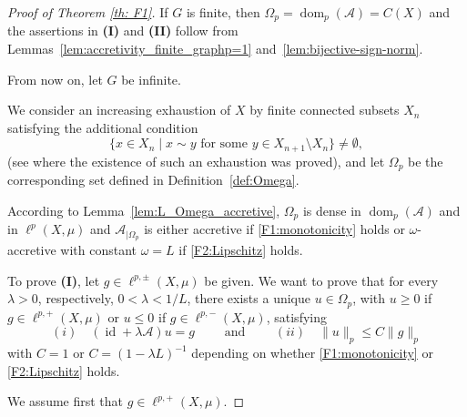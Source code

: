 \documentclass[journal]{article}
\theoremstyle{nonitalic}
\theoremstyle{nonitalic}
\theoremstyle{plain} %
\numberwithin{equation}{section}
\newcommand{\dom}{\operatorname{dom}}
\begin{document}
\begin{proof}[Proof of Theorem \ref{th: F1}]
 If $G$ is finite, then $\Omega_p= \dom_p(\mathcal{A})=C(X)$ and the assertions  in \textnormal{\textbf{(I)}} and \textnormal{\textbf{(II)}} follow from Lemmas~\ref{lem:accretivity_finite_graphp=1} and~\ref{lem:bijective-sign-norm}. 
 
 
 From now on, let $G$ be infinite.  

We consider an increasing exhaustion of $X$ by finite connected subsets $X_n$ satisfying the additional condition 
\begin{equation}\label{eq:property_sets2}
	\{ x \in X_n \mid x\sim y \mbox{ for some } y \in X_{n+1}\setminus X_n \} \ne \emptyset,
\end{equation}
(see \cite[Lemma A.4 ]{bianchi2022generalized} where the existence of such an exhaustion was proved), and let $\Omega_p$ be the corresponding set defined in Definition~\ref{def:Omega}.


According to Lemma~\ref{lem:L_Omega_accretive}, $\Omega_p$  is dense in $\dom_p(\mathcal A)$ and in $\ell^p(X,\mu)$ and  $\mathcal{A}_{|\Omega_p}$  is either accretive if \textnormal{\ref{F1:monotonicity}} holds or $\omega$-accretive with constant $\omega=L$ if \textnormal{\ref{F2:Lipschitz}} holds.

To prove \textnormal{\textbf{(I)}}, let  $g\in \ell^{p,\pm}(X,\mu)$ be given. We want to prove that  for every $\lambda>0$, respectively, $0< \lambda<1/L$, there exists a unique $u\in \Omega_p$, with $u\geq 0$ if  $g\in \ell^{p,+}(X,\mu)$ or $u\leq 0$ if $g\in \ell^{p,-}(X,\mu)$, satisfying
\begin{equation}\label{u-pm-1}
(i)\quad (\operatorname{id} +\lambda \mathcal{A})u=g \qquad\text{ and } \qquad (ii)\quad \|u\|_p\leq C\|g\|_p
\end{equation}
with $C=1$ or $C=(1-\lambda L)^{-1}$ depending on whether \textnormal{\ref{F1:monotonicity}}
or \textnormal{\ref{F2:Lipschitz}} holds.

We assume first that $g\in \ell^{p,+}(X,\mu)$. 





\end{proof}
\end{document}
